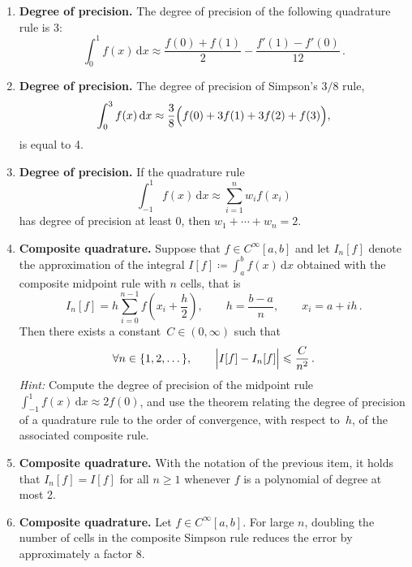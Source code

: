 \documentclass[a4paper]{article}
\renewcommand{\d}{\mathrm d}
\begin{document}
\begin{enumerate}

    \item
        \textbf{Degree of precision.}
        The degree of precision of the following quadrature rule is 3:
        \[
            \int_0^1 f(x) \, \d x \approx \frac{f(0) + f(1)}{2} - \frac{f'(1) - f'(0)}{12}\,.
        \]

    \item
        \textbf{Degree of precision.}
        The degree of precision of Simpson's $3/8$ rule,
        \[
            \int_0^3 f(x) \, \d x \approx \frac{3}{8} \Bigl( f(0) + 3 f(1) + 3 f(2) + f(3) \Bigr),
        \]
        is equal to 4.

    \item
        \textbf{Degree of precision.}
        If the quadrature rule
        \[
            \int_{-1}^{1} f(x) \, \d x \approx \sum_{i=1}^{n} w_i f(x_i)
        \]
        has degree of precision at least $0$, then $w_1 + \dotsb + w_n = 2$.

    \item
        \textbf{Composite quadrature.}
        Suppose that $f \in C^{\infty}[a, b]$ and let $I_n[f]$ denote the approximation of the integral $I[f] \coloneq \int_a^b f(x) \, \d x$
        obtained with the composite midpoint rule with $n$ cells, that is
        \[
            I_n[f] = h \sum_{i=0}^{n-1} f\left(x_i + \frac{h}{2}\right), \qquad h = \frac{b-a}{n}, \qquad x_i = a + i h\,.
        \]
        Then there exists a constant~$C \in (0, \infty)$ such that
        \[
            \forall n \in \{1, 2, \dotsc\}, \qquad \Bigl\lvert I[f] - I_n[f] \Bigr\rvert \leq \frac{C}{n^2}\,.
        \]
        \emph{Hint:} Compute the degree of precision of the midpoint rule $\int_{-1}^{1} f(x) \, \d x \approx 2 f(0)$,
        and use the theorem relating the degree of precision of a quadrature rule to the order of convergence, with respect to~$h$, of the associated composite rule.

    \item
        \textbf{Composite quadrature.}
        With the notation of the previous item, it holds that $I_n[f] = I[f]$ for all $n \geq 1$
        whenever $f$ is a polynomial of degree at most 2.

    \item
        \textbf{Composite quadrature.}
        Let $f \in C^{\infty}[a, b]$.
        For large $n$, doubling the number of cells in the composite Simpson rule
        reduces the error by approximately a factor $8$.


\end{enumerate}
\end{document}
